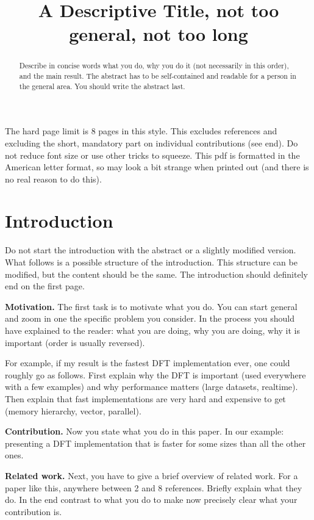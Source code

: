 \documentclass[letterpaper]{article}
\title{A Descriptive Title, not too general, not too long}
\newcommand{\mypar}[1]{{\bf #1.}}
\begin{document}
%
\maketitle
%

The hard page limit is 8 pages in this style. This excludes references and excluding the short, mandatory part on individual contributions (see end). Do not reduce font size
or use other tricks to squeeze. This pdf is formatted in the American letter format, so may look a bit strange when printed out (and there is no real reason to do this).

\begin{abstract}
Describe in concise words what you do, why you do it (not necessarily
in this order), and the main result. The abstract has to be
self-contained and readable for a person in the general area. You
should write the abstract last.
\end{abstract}

\section{Introduction}\label{sec:intro}

Do not start the introduction with the abstract or a slightly modified
version. What follows is a possible structure of the introduction.
This structure can be modified, but the content should be the same. The introduction should definitely end on the first page.

\mypar{Motivation} The first task is to motivate what you do.  You can
start general and zoom in one the specific problem you consider.  In
the process you should have explained to the reader: what you are doing,
why you are doing, why it is important (order is usually reversed).

For example, if my result is the fastest DFT implementation ever, one
could roughly go as follows. First explain why the DFT is important
(used everywhere with a few examples) and why performance matters (large datasets,
realtime). Then explain that fast implementations are very hard and
expensive to get (memory hierarchy, vector, parallel).

\mypar{Contribution}
Now you state what you do in this paper. In our example:
presenting a DFT implementation that is
faster for some sizes than all the other ones.

\mypar{Related work} Next, you have to give a brief overview of
related work. For a paper like this, anywhere between 2 and 8
references. Briefly explain what they do. In the end contrast to what
you do to make now precisely clear what your contribution is.
\end{document}
